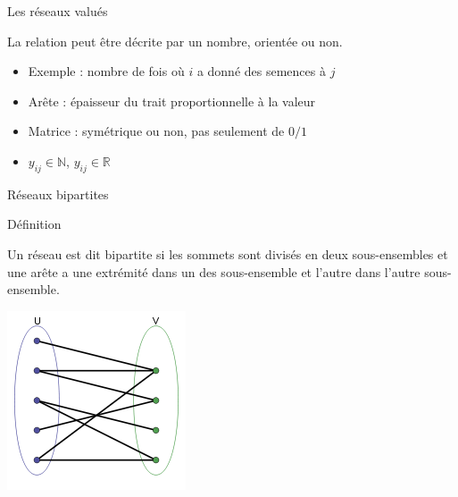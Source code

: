\documentclass[compress,10pt]{beamer}
\begin{document}
\begin{frame}{Les réseaux valués}

La relation peut être décrite par un nombre, orientée ou non. 

\begin{itemize}
\item Exemple : nombre de fois où $i$ a donné des semences à $j$
\item Arête : épaisseur du trait proportionnelle à la valeur
\item Matrice : symétrique ou non, pas seulement de $0/1$
\item $y_{ij} \in \mathbb{N}$, $y_{ij} \in \mathbb{R}$  
\end{itemize}

\end{frame}


 


\begin{frame}{Réseaux bipartites}

\begin{block}{Définition}

Un réseau est dit bipartite si les sommets sont divisés en deux sous-ensembles et  une arête a une extrémité dans un des sous-ensemble et l'autre dans l'autre sous-ensemble. 
\end{block}
\begin{center}
   \includegraphics[width =0.3\linewidth]{plots/Simple-bipartite-graph.png}
\end{center}
\end{frame}
\end{document}

